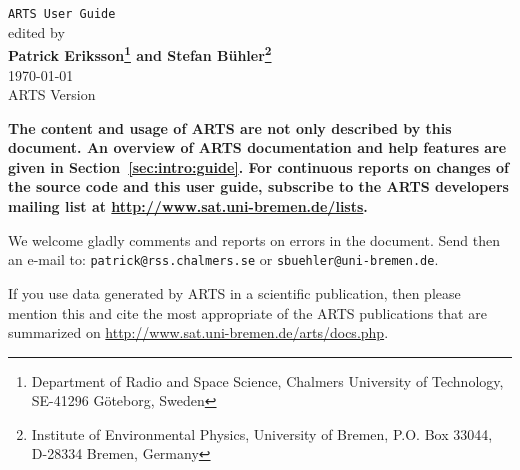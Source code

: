 





%
\renewcommand{\thepage}{title \arabic{page}} 

\thispagestyle{plain}
\begin{center}
  \vspace*{2cm}
  {\Huge \verb|ARTS User Guide|\\}
  \vspace*{1cm}
  {\large edited by \\}
  \vspace*{1cm}
  {\Large \bf Patrick Eriksson\footnote{
      Department of Radio and Space Science, 
      Chalmers University of Technology, SE-41296 G\"oteborg, Sweden} 
      and
    Stefan B\"uhler\footnote{
      Institute of Environmental Physics, University of Bremen, 
      P.O. Box 33044, D-28334 Bremen, Germany}  
    }\\
   \vspace*{2cm}
   {\large \today\\
    ARTS Version 
   }
\end{center}
\vspace*{4cm}
{\normalsize \bf
  \noindent
  The content and usage of ARTS are not only described by this
  document. An overview of ARTS documentation and help features are
  given in Section~\ref{sec:intro:guide}. For continuous reports on
  changes of the source code and this user guide, subscribe to the
  ARTS developers mailing list at \url{http://www.sat.uni-bremen.de/lists}.

  We welcome gladly comments and reports on errors in the document.
  Send then an e-mail to: \verb|patrick@rss.chalmers.se| or 
  \verb|sbuehler@uni-bremen.de|.

  If you use data generated by ARTS in a scientific
  publication, then please mention this and cite the most
  appropriate of the ARTS publications that are summarized on
  \url{http://www.sat.uni-bremen.de/arts/docs.php}.
}

